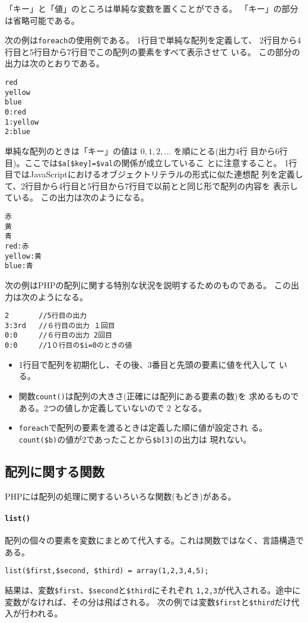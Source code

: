 「キー」と「値」のところは単純な変数を置くことができる。
「キー」の部分は省略可能である。
\begin{Exec}\upshape
 次の例は\texttt{foreach}の使用例である。
 1行目で単純な配列を定義して、
 2行目から4行目と5行目から7行目でこの配列の要素をすべて表示させて
       いる。
この部分の出力は次のとおりである。
\begin{verbatim}
red
yellow
blue
0:red
1:yellow
2:blue
\end{verbatim}
 単純な配列のときは「キー」の値は $0,1,2,\dots$ を順にとる(出力4行
       目から6行目)。ここでは\Verb+$a[$key]=$val+の関係が成立しているこ
       とに注意すること。
 1行目ではJavaScriptにおけるオブジェクトリテラルの形式に似た連想配
       列を定義して、2行目から4行目と5行目から7行目で以前とと同じ形で配列の内容を
       表示している。
この出力は次のようになる。
\begin{Verbatim}
赤
黄
青
red:赤
yellow:黄
blue:青
\end{Verbatim}
\end{Exec}%
\begin{Exec}\upshape
次の例はPHPの配列に関する特別な状況を説明するためのものである。
この出力は次のようになる。%
\begin{Verbatim}
2       //5行目の出力
3:3rd   //６行目の出力 １回目
0:0     //６行目の出力 2回目
0:0     //1０行目の$i=0のときの値
\end{Verbatim}
\begin{itemize}\upshape
 \item 1行目で配列を初期化し、その後、$3$番目と先頭の要素に値を代入して
       いる。
 \item 関数\texttt{count()}は配列の大きさ(正確には配列にある要素の数)を
       求めるものである。2つの値しか定義していないので $2$ となる。
 \item \texttt{foreach}で配列の要素を渡るときは定義した順に値が設定され
       る。\Verb+count($b)+の値が$2$であったことから\Verb+$b[3]+の出力は
       現れない。
\end{itemize}
 \end{Exec}
\subsection{配列に関する関数}
PHPには配列の処理に関するいろいろな関数(もどき)がある。
\paragraph{\protect\texttt{list()}}
配列の個々の要素を変数にまとめて代入する。これは関数ではなく、言語構造である。
\begin{Verbatim}
list($first,$second, $third) = array(1,2,3,4,5);
\end{Verbatim}
結果は、変数\Verb+$first+、\Verb+$second+と\Verb+$third+にそれぞれ
\texttt{1,2,3}が代入される。途中に変数がなければ、その分は飛ばされる。
次の例では変数\Verb+$first+と\Verb+$third+だけ代入が行われる。

